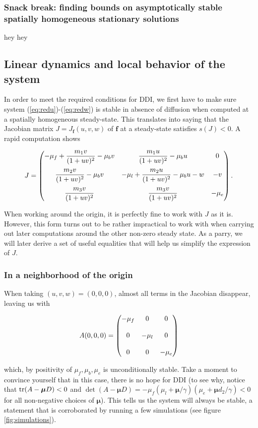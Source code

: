 	

\subsubsection{Snack break: finding bounds on asymptotically stable spatially homogeneous stationary solutions}

hey hey


\subsection{Linear dynamics and local behavior of the system}

In order to meet the required conditions for DDI, we first have to make sure system (\ref{eq:redu})-(\ref{eq:redw}) is stable in absence of diffusion when computed at a spatially homogeneous steady-state. This translates into saying that the Jacobian matrix $J = J_{\bm f}(u, v, w)$ of $\bm f$ at a steady-state satisfies $s(J) < 0$. A rapid computation shows

$$
J = \begin{pmatrix}  -\mu_f +  \dfrac{m_1v}{(1+u v)^2} - \mu_b v &  \dfrac{m_1 u}{(1+u v)^2} - \mu_b u & 0 \\[1.2em]
 \dfrac{m_2 v}{(1+u v)^2} - \mu_b v   & -\mu_l + \dfrac{m_2 u}{(1+u v)^2} - \mu_b u - w  & -v \\[1.2em] 
  \dfrac{m_3 v}{(1+u v)^2} &  \dfrac{m_3 v}{(1+u v)^2} & -\mu_e \end{pmatrix}.
$$

When working around the origin, it is perfectly fine to work with $J$ as it is. However, this form turns out to be rather impractical to work with when carrying out later computations around the other non-zero steady state. As a parry, we will later derive a set of useful equalities that will help us simplify the expression of $J$.

\subsubsection{In a neighborhood of the origin}

When taking $(u, v, w) = (0, 0, 0)$, almost all terms in the Jacobian disappear, leaving us with

$$
A(0, 0, 0) = \begin{pmatrix}  -\mu_f  &  0 & 0 \\[1.2em]
0  & -\mu_l & 0 \\[1.2em] 
0 & 0 & -\mu_e \end{pmatrix}
$$

which, by positivity of $\mu_f, \mu_b, \mu_e$ is unconditionally stable. Take a moment to convince yourself that in this case, there is no hope for DDI (to see why, notice that $\mathrm{tr} (A-\bm\mu D) < 0$ and $\det (A-\bm\mu D) = -\mu_f(\mu_l+ \bm\mu / \gamma)(\mu_e + \bm\mu d_2 / \gamma) < 0$ for all non-negative choices of $\bm\mu$). This tells us the system will always be stable, a statement that is corroborated by running a few simulations (see figure \ref{fig:simulations}).

